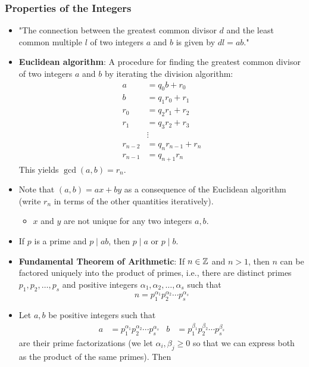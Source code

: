 \documentclass[../main.tex]{subfiles}
\begin{document}
\subsubsection{Properties of the Integers}
\begin{itemize}
    \item "The connection between the greatest common divisor $d$ and the least common multiple $l$ of two integers $a$ and $b$ is given by $dl=ab$."
    \item \textbf{Euclidean algorithm}: A procedure for finding the greatest common divisor of two integers $a$ and $b$ by iterating the division algorithm:
    \begin{align*}
        a &= q_0b+r_0\\
        b &= q_1r_0+r_1\\
        r_0 &= q_2r_1+r_2\\
        r_1 &= q_3r_2+r_3\\
        &\vdots\\
        r_{n-2} &= q_nr_{n-1}+r_n\\
        r_{n-1} &= q_{n+1}r_n
    \end{align*}
    This yields $\gcd(a,b)=r_n$.
    \item Note that $(a,b)=ax+by$ as a consequence of the Euclidean algorithm (write $r_n$ in terms of the other quantities iteratively).
    \begin{itemize}
        \item $x$ and $y$ are not unique for any two integers $a,b$.
    \end{itemize}
    \item If $p$ is a prime and $p\mid ab$, then $p\mid a$ or $p\mid b$.
    \item \textbf{Fundamental Theorem of Arithmetic}: If $n\in\mathbb{Z}$ and $n>1$, then $n$ can be factored uniquely into the product of primes, i.e., there are distinct primes $p_1,p_2,\dots,p_s$ and positive integers $\alpha_1,\alpha_2,\dots,\alpha_s$ such that
    \begin{equation*}
        n = p_1^{\alpha_1}p_2^{\alpha_2}\cdots p_s^{\alpha_s}
    \end{equation*}
    \item Let $a,b$ be positive integers such that
    \begin{align*}
        a &= p_1^{\alpha_1}p_2^{\alpha_2}\cdots p_s^{\alpha_s}&
        b &= p_1^{\beta_1}p_2^{\beta_2}\cdots p_s^{\beta_s}
    \end{align*}
    are their prime factorizations (we let $\alpha_i,\beta_j\geq 0$ so that we can express both as the product of the same primes). Then

\end{itemize}
\end{document}
